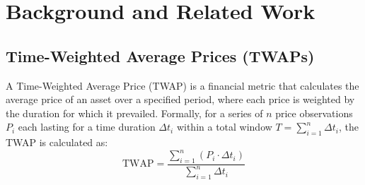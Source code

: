 \documentclass{article}
\begin{document}
\section{Background and Related Work}
\label{sec:background}
\subsection{Time-Weighted Average Prices (TWAPs)}
A Time-Weighted Average Price (TWAP) is a financial metric that calculates the average price of an asset over a specified period, where each price is weighted by the duration for which it prevailed. Formally, for a series of $n$ price observations $P_i$ each lasting for a time duration $\Delta t_i$ within a total window $T = \sum_{i=1}^{n} \Delta t_i$, the TWAP is calculated as:
\[ \text{TWAP} = \frac{\sum_{i=1}^{n} (P_i \cdot \Delta t_i)}{\sum_{i=1}^{n} \Delta t_i} \]
\end{document}
